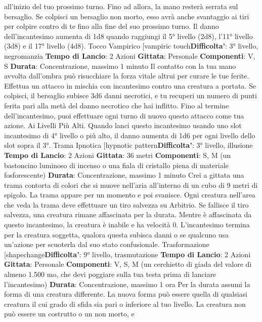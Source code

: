 \begin{multicols}{2}
all’inizio del tuo prossimo turno. Fino ad allora, la mano
resterà serrata sul bersaglio.
Se colpisci un bersaglio non morto, esso avrà anche
svantaggio ai tiri per colpire contro di te fino alla fine del
suo prossimo turno.
Il danno dell’incantesimo aumenta di 1d8 quando
raggiungi il 5° livello (2d8), l’11° livello (3d8) e il 17°
livello (4d8).
Tocco Vampirico
[vampiric touch\textbf{Difficolta'}:
3° livello, negromanzia
\textbf{Tempo di Lancio}: 2 Azioni
\textbf{Gittata}: Personale
\textbf{Componenti}: V, S
\textbf{Durata}: Concentrazione, massimo 1 minuto
Il contatto con la tua mano avvolta dall’ombra può
risucchiare la forza vitale altrui per curare le tue ferite.
Effettua un attacco in mischia con incantesimo contro
una creatura a portata. Se colpisci, il bersaglio subisce
3d6 danni necrotici, e tu recuperi un numero di punti
ferita pari alla metà del danno necrotico che hai inflitto.
Fino al termine dell’incantesimo, puoi effettuare ogni
turno di nuovo questo attacco come tua azione.
Ai Livelli Più Alti. Quando lanci questo incantesimo
usando uno slot incantesimo di 4° livello o più alto, il
danno aumenta di 1d6 per ogni livello dello slot sopra il
3°.
Trama Ipnotica
[hypnotic pattern\textbf{Difficolta'}:
3° livello, illusione
\textbf{Tempo di Lancio}: 2 Azioni
\textbf{Gittata}: 36 metri
\textbf{Componenti}: S, M (un bastoncino luminoso di incenso
o una fiala di cristallo piena di materiale fosforescente)
\textbf{Durata}: Concentrazione, massimo 1 minuto
Crei a gittata una trama contorta di colori che si muove
nell’aria all’interno di un cubo di 9 metri di spigolo. La
trama appare per un momento e poi svanisce. Ogni
creatura nell’area che veda la trama deve effettuare un
tiro salvezza su Arbitrio. Se fallisce il tiro salvezza,
una creatura rimane affascinata per la durata. Mentre è
affascinata da questo incantesimo, la creatura è inabile
e ha velocità 0.
L’incantesimo termina per la creatura soggetta, qualora
questa subisca danni o se qualcuno usa un’azione per
scuoterla dal suo stato confusionale.
Trasformazione
[shapechange\textbf{Difficolta'}:
9° livello, trasmutazione
\textbf{Tempo di Lancio}: 2 Azioni
\textbf{Gittata}: Personale
\textbf{Componenti}: V, S, M (un cerchietto di giada del valore
di almeno 1.500 mo, che devi poggiare sulla tua testa
prima di lanciare l’incantesimo)
\textbf{Durata}: Concentrazione, massimo 1 ora
Per la durata assumi la forma di una creatura differente.
La nuova forma può essere quella di qualsiasi creatura
il cui grado di sfida sia pari o inferiore al tuo livello. La 
creatura non può essere un costrutto o un non morto, e

\end{multicols}
